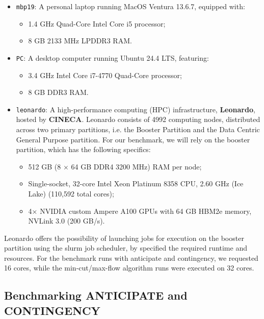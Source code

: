 \documentclass[a4paper,singleside,12pt]{report} %
\begin{document}
\begin{itemize}
    \item \verb|mbp19|: A personal laptop running MacOS Ventura 13.6.7, equipped with:
    \begin{itemize}
        \item 1.4 GHz Quad-Core Intel Core i5 processor;
        \item 8 GB 2133 MHz LPDDR3 RAM.
    \end{itemize}
    
    \item \verb|PC|: A desktop computer running Ubuntu 24.4 LTS, featuring:
    \begin{itemize}
        \item 3.4 GHz Intel Core i7-4770 Quad-Core processor;
        \item 8 GB DDR3 RAM.
    \end{itemize}
    
    \item \verb|leonardo|: A high-performance computing (HPC) infrastructure, \textbf{Leonardo}, hosted by \textbf{CINECA}. Leonardo consists of 4992 computing nodes, distributed across 
    two primary partitions, i.e. the Booster Partition and the Data Centric General Purpose partition. For our benchmark, we will rely on the booster partition, which has the following 
    specifics:
    \begin{itemize}
        \item 512 GB (8 × 64 GB DDR4 3200 MHz) RAM per node;
        \item Single-socket, 32-core Intel Xeon Platinum 8358 CPU, 2.60 GHz (Ice Lake) (110,592 total cores);
        \item 4× NVIDIA custom Ampere A100 GPUs with 64 GB HBM2e memory, NVLink 3.0 (200 GB/s).
    \end{itemize}
\end{itemize}

Leonardo offers the possibility of launching jobs for execution on the booster partition using the slurm job scheduler, by specified the required runtime and resources. For the benchmark 
runs with anticipate and contingency, we requested 16 cores, while the min-cut/max-flow algorithm runs were executed on 32 cores.

\subsection{Benchmarking ANTICIPATE and CONTINGENCY}
\end{document}
